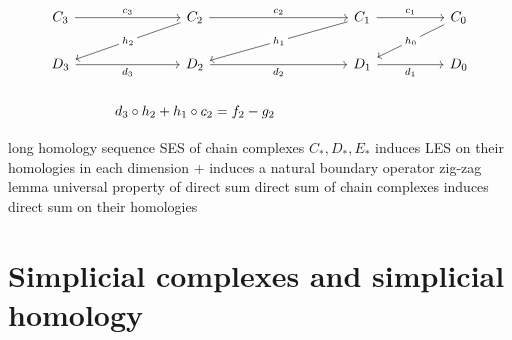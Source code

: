 \begin{outline}
\[\begin{tikzcd}
    {C_3} & {C_2} & {C_1} & {C_0} \\
    {D_3} & {D_2} & {D_1} & {D_0} \\
    & {d_3\circ h_2 + h_1 \circ c_2 = f_2 - g_2} & \qquad\qquad\qquad
    \arrow["{c_3}", from=1-1, to=1-2]
    \arrow["{c_2}", from=1-2, to=1-3]
    \arrow["{c_1}", from=1-3, to=1-4]
    \arrow["{d_3}"', from=2-1, to=2-2]
    \arrow["{d_2}"', from=2-2, to=2-3]
    \arrow["{d_1}"', from=2-3, to=2-4]
    \arrow["{h_2}"{description}, from=1-2, to=2-1]
    \arrow["{h_1}"{description}, from=1-3, to=2-2]
    \arrow["{h_0}"{description}, from=1-4, to=2-3]
\end{tikzcd}\]

\end{outline}

\begin{outline}
    \1 long homology sequence
        \2 SES of chain complexes $C_*,D_*,E_*$ induces LES on their homologies in each dimension + induces a natural boundary operator
        \2 zig-zag lemma
    \1 universal property of direct sum 
        \2 direct sum of chain complexes induces direct sum on their homologies
\end{outline}

\section{Simplicial complexes and simplicial homology}

